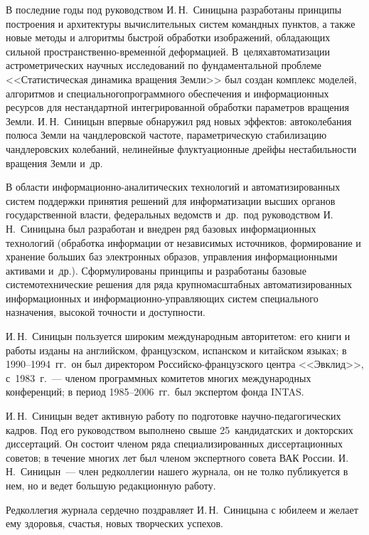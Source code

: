\begin{multicols}{2}
     В последние годы под руководством И.\,Н.~Синицына разработаны принципы построения 
и архитектуры вычислительных систем командных пунктов, а также новые методы и алгоритмы 
быстрой обработки изображений, обладающих сильной про\-стран\-ст\-вен\-но-вре\-мен\-н\'{о}й 
деформацией. В~целях\linebreak автоматизации астрометрических научных исследований по 
фундаментальной проблеме <<Статистическая динамика вращения Земли>> был создан 
комплекс моделей, алгоритмов и специального\linebreak программного обеспечения и информационных 
ресурсов для нестандартной интегрированной обработки параметров вращения Земли. 
И.\,Н.~Синицын впервые обнаружил ряд новых эффектов: автоколебания полюса Земли на 
чандлеровской частоте, параметрическую стабилизацию чандлеровских колебаний, нелинейные 
флуктуационные дрейфы нестабильности вращения Земли и~др.
     
     В области информационно-аналитических технологий и автоматизированных систем 
поддержки принятия решений для информатизации высших органов государственной власти, 
федеральных ведомств и~др.\ под руководством И.\,Н.~Синицына был разработан и внедрен 
ряд базовых информационных технологий (обработка информации от независимых источников, 
формирование и хранение больших баз электронных образов, управления информационными 
активами и~др.). Сформулированы принципы и разработаны базовые системотехнические 
решения для ряда крупномасштабных автоматизированных информационных и 
     ин\-фор\-ма\-ци\-он\-но-управ\-ля\-ющих систем специального назначения, высокой 
точности и доступности. 
     
     И.\,Н.~Синицын пользуется широким международным авторитетом: его книги и работы 
изданы на английском, французском, испанском и китайском языках; в 1990--1994~гг.\ он был 
директором Рос\-сий\-ско-фран\-цуз\-ско\-го центра <<Эвклид>>, с~1983~г.~--- членом 
программных комитетов многих международных конференций; в период 1985--2006~гг.\ был 
экспертом фонда INTAS.
     
     И.\,Н.~Синицын ведет активную работу по подготовке научно-педагогических кадров. 
Под его руководством выполнено свыше 25~кандидатских и докторских диссертаций. Он 
состоит членом ряда специализированных диссертационных советов; в течение многих лет был 
членом экспертного совета ВАК России. И.\,Н.~Синицын~--- член редколлегии нашего 
журнала, он не толко публикуется в нем, но и ведет большую редакционную работу.

\label{end\stat}
     
     \bigskip
     Редколлегия журнала сердечно поздравляет И.\,Н.~Синицына с юбилеем и желает ему 
здо\-ровья, счастья, новых творческих успехов.


\end{multicols}